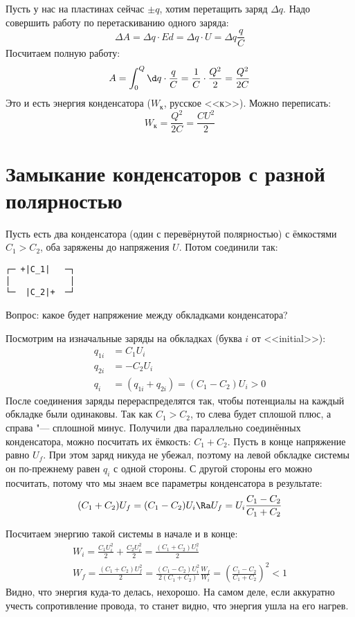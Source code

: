   Пусть у нас на пластинах сейчас $\pm q$, хотим перетащить заряд $\Delta q$.
  Надо совершить работу по перетаскиванию одного заряда:
  \[\Delta A=\Delta q \cdot E d = \Delta q \cdot U = \Delta q \frac q C\]
  Посчитаем полную работу:
  \[A = \int_0^Q \d q \cdot \frac q C = \frac 1C \cdot \frac{Q^2}{2} = \frac{Q^2}{2C}\]
  Это и есть энергия конденсатора ($W_к$, русское <<к>>).
  Можно переписать:
  \[W_к = \frac{Q^2}{2C} = \frac{CU^2}{2}\]

\section{Замыкание конденсаторов с разной полярностью}
  Пусть есть два конденсатора (один с перевёрнутой полярностью) с ёмкостями $C_1 > C_2$, оба заряжены до напряжения $U$.
  Потом соединили так:
\begin{verbatim}
┌─ +|C_1|   ─┐
│            │
└─  |C_2|+  ─┘
\end{verbatim}
    Вопрос: какое будет напряжение между обкладками конденсатора?

    Посмотрим на изначальные заряды на обкладках (буква $i$ от <<initial>>):
    \begin{align*}
      q_{1i} &= C_1 U_i \\
      q_{2i} &= -C_2 U_i \\
      q_i &= (q_{1i}+q_{2i}) = (C_1-C_2) U_i > 0
    \end{align*}
    После соединения заряды перераспределятся так, чтобы потенциалы на каждый обкладке были одинаковы.
    Так как $C_1>C_2$, то слева будет сплошой плюс, а справа "--- сплошной минус.
    Получили два параллельно соединённых конденсатора, можно посчитать их ёмкость: $C_1+C_2$.
    Пусть в конце напряжение равно $U_f$.
    При этом заряд никуда не убежал, поэтому на левой обкладке системы он по-прежнему равен $q_i$ с одной стороны.
    С другой стороны его можно посчитать, потому что мы знаем все параметры конденсатора в результате:
    \[ (C_1+C_2)U_f = (C_1-C_2)U_i \Ra U_f = U_i\frac{C_1-C_2}{C_1+C_2}\]

    Посчитаем энергию такой системы в начале и в конце:
    \begin{gather*}
    W_i = \frac{C_1U_i^2}{2} + \frac{C_2U_i^2}{2} = \frac{(C_1+C_2)U_i^2}{2} \\
    W_f = \frac{(C_1+C_2)U_f^2}{2} = \frac{(C_1-C_2)U_i^2}{2(C_1+C_2)}
    \frac{W_f}{W_i} = \left(\frac{C_1-C_2}{C_1+C_2}\right)^2 < 1
    \end{gather*}
    Видно, что энергия куда-то делась, нехорошо.
    На самом деле, если аккуратно учесть сопротивление провода, то станет видно, что энергия ушла на его нагрев.
